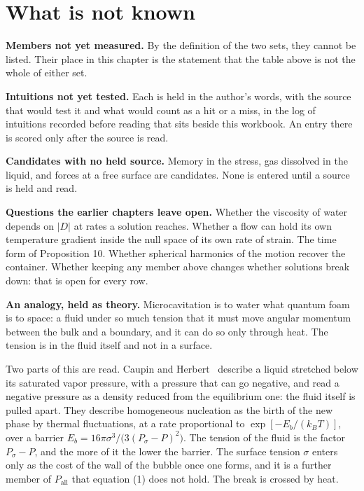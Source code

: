 \section{What is not known}

\textbf{Members not yet measured.} By the definition of the two sets, they cannot be listed. Their
place in this chapter is the statement that the table above is not the whole of either set.

\textbf{Intuitions not yet tested.} Each is held in the author's words, with the source that would
test it and what would count as a hit or a miss, in the log of intuitions recorded before reading
that sits beside this workbook. An entry there is scored only after the source is read.

\textbf{Candidates with no held source.} Memory in the stress, gas dissolved in the liquid, and
forces at a free surface are candidates. None is entered until a source is held and read.

\textbf{Questions the earlier chapters leave open.} Whether the viscosity of water depends on $|D|$
at rates a solution reaches. Whether a flow can hold its own temperature gradient inside the null
space of its own rate of strain. The time form of Proposition 10. Whether spherical harmonics of
the motion recover the container. Whether keeping any member above changes whether solutions break
down: that is open for every row.

\textbf{An analogy, held as theory.} Microcavitation is to water what quantum foam is to space: a
fluid under so much tension that it must move angular momentum between the bulk and a boundary,
and it can do so only through heat. The tension is in the fluid itself and not in a surface.

Two parts of this are read. Caupin and Herbert~\cite{src:Caupin-and-Herbert-2006} describe a liquid stretched below its saturated
vapor pressure, with a pressure that can go negative, and read a negative pressure as a density
reduced from the equilibrium one: the fluid itself is pulled apart. They describe homogeneous
nucleation as the birth of the new phase by thermal fluctuations, at a rate proportional to
$\exp[-E_b/(k_BT)]$, over a barrier $E_b = 16\pi\sigma^3/\bigl(3(P_\sigma - P)^2\bigr)$. The tension
of the fluid is the factor $P_\sigma - P$, and the more of it the lower the barrier. The surface
tension $\sigma$ enters only as the cost of the wall of the bubble once one forms, and it is a
further member of $P_{\mathrm{all}}$ that equation (1) does not hold. The break is crossed by heat.

